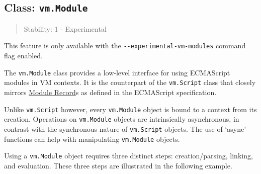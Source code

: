 \begin{Shaded}
\begin{Highlighting}[]
\OperatorTok{=} \NormalTok{(}\NormalTok{)}\OperatorTok{;}

\OperatorTok{=} \NormalTok{(}\VerbatimStringTok{\textasciigrave{}}
\VerbatimStringTok{\textasciigrave{}}\NormalTok{)}\OperatorTok{;}

\NormalTok{)}\OperatorTok{;}
\end{Highlighting}
\end{Shaded}

\subsection{\texorpdfstring{Class:
\texttt{vm.Module}}{Class: vm.Module}}\label{class-vm.module}

\begin{quote}
Stability: 1 - Experimental
\end{quote}

This feature is only available with the
\texttt{-\/-experimental-vm-modules} command flag enabled.

The \texttt{vm.Module} class provides a low-level interface for using
ECMAScript modules in VM contexts. It is the counterpart of the
\texttt{vm.Script} class that closely mirrors
\href{https://262.ecma-international.org/14.0/\#sec-abstract-module-records}{Module
Record}s as defined in the ECMAScript specification.

Unlike \texttt{vm.Script} however, every \texttt{vm.Module} object is
bound to a context from its creation. Operations on \texttt{vm.Module}
objects are intrinsically asynchronous, in contrast with the synchronous
nature of \texttt{vm.Script} objects. The use of `async' functions can
help with manipulating \texttt{vm.Module} objects.

Using a \texttt{vm.Module} object requires three distinct steps:
creation/parsing, linking, and evaluation. These three steps are
illustrated in the following example.

